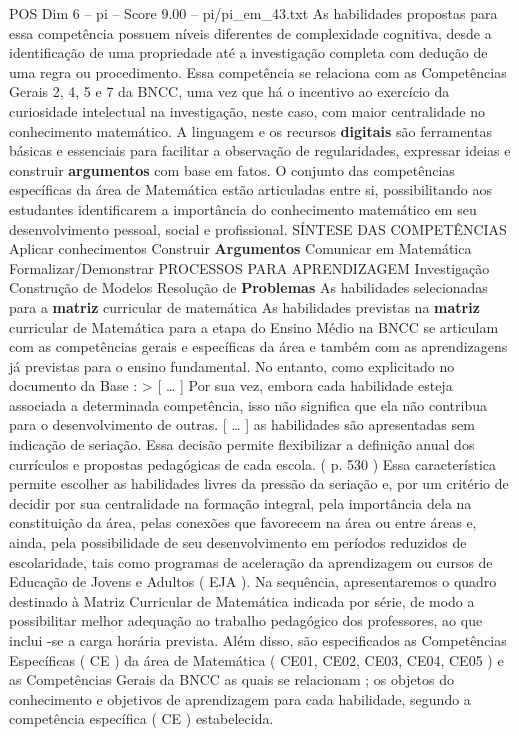 \begin{textsample}{POS Dim 6 – pi – Score 9.00 – pi/pi\_em\_43.txt}
As habilidades propostas para essa competência possuem níveis diferentes de complexidade cognitiva, desde a identificação de uma propriedade até a investigação completa com dedução de uma regra ou procedimento.
Essa competência se relaciona com as Competências Gerais 2, 4, 5 e 7 da BNCC, uma vez que há o incentivo ao exercício da curiosidade intelectual na investigação, neste caso, com maior centralidade no conhecimento matemático.
A linguagem e os recursos \textbf{digitais} são ferramentas básicas e essenciais para facilitar a observação de regularidades, expressar ideias e construir \textbf{argumentos} com base em fatos.
O conjunto das competências específicas da área de Matemática estão articuladas entre si, possibilitando aos estudantes identificarem a importância do conhecimento matemático em seu desenvolvimento pessoal, social e profissional.
SÍNTESE DAS COMPETÊNCIAS Aplicar conhecimentos Construir \textbf{Argumentos} Comunicar em Matemática Formalizar/Demonstrar PROCESSOS PARA APRENDIZAGEM Investigação Construção de Modelos Resolução de \textbf{Problemas} As habilidades selecionadas para a \textbf{matriz} curricular de matemática As habilidades previstas na \textbf{matriz} curricular de Matemática para a etapa do Ensino Médio na BNCC se articulam com as competências gerais e específicas da área e também com as aprendizagens já previstas para o ensino fundamental.
No entanto, como explicitado no documento da Base : > [ … ] Por sua vez, embora cada habilidade esteja associada a determinada competência, isso não significa que ela não contribua para o desenvolvimento de outras. [ … ] as habilidades são apresentadas sem indicação de seriação.
Essa decisão permite flexibilizar a definição anual dos currículos e propostas pedagógicas de cada escola. ( p. 530 ) Essa característica permite escolher as habilidades livres da pressão da seriação e, por um critério de decidir por sua centralidade na formação integral, pela importância dela na constituição da área, pelas conexões que favorecem na área ou entre áreas e, ainda, pela possibilidade de seu desenvolvimento em períodos reduzidos de escolaridade, tais como programas de aceleração da aprendizagem ou cursos de Educação de Jovens e Adultos ( EJA ).
Na sequência, apresentaremos o quadro destinado à Matriz Curricular de Matemática indicada por série, de modo a possibilitar melhor adequação ao trabalho pedagógico dos professores, ao que inclui -se a carga horária prevista.
Além disso, são especificados as Competências Específicas ( CE ) da área de Matemática ( CE01, CE02, CE03, CE04, CE05 ) e as Competências Gerais da BNCC as quais se relacionam ; os objetos do conhecimento e objetivos de aprendizagem para cada habilidade, segundo a competência específica ( CE ) estabelecida.

\end{textsample}
